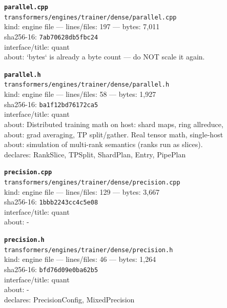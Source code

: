 \noindent\textbf{\texttt{parallel.cpp}}\\
\texttt{transformers/engines/trainer/dense/parallel.cpp}\\
kind: engine file --- lines/files: 197 --- bytes: 7,011\\
sha256-16: \texttt{7ab70628db5fbc24}\\
interface/title: quant\\
about: `bytes` is already a byte count — do NOT scale it again.\\
\vspace*{6.0pt}

\noindent\textbf{\texttt{parallel.h}}\\
\texttt{transformers/engines/trainer/dense/parallel.h}\\
kind: engine file --- lines/files: 58 --- bytes: 1,927\\
sha256-16: \texttt{ba1f12bd76172ca5}\\
interface/title: quant\\
about: Distributed training math on host: shard maps, ring allreduce,\\
about: grad averaging, TP split/gather. Real tensor math, single-host\\
about: simulation of multi-rank semantics (ranks run as slices).\\
declares: RankSlice, TPSplit, ShardPlan, Entry, PipePlan\\
\vspace*{6.0pt}

\noindent\textbf{\texttt{precision.cpp}}\\
\texttt{transformers/engines/trainer/dense/precision.cpp}\\
kind: engine file --- lines/files: 129 --- bytes: 3,667\\
sha256-16: \texttt{1bbb2243cc4c5e08}\\
interface/title: quant\\
about: -\\
\vspace*{6.0pt}

\noindent\textbf{\texttt{precision.h}}\\
\texttt{transformers/engines/trainer/dense/precision.h}\\
kind: engine file --- lines/files: 46 --- bytes: 1,264\\
sha256-16: \texttt{bfd76d09e0ba62b5}\\
interface/title: quant\\
about: -\\
declares: PrecisionConfig, MixedPrecision\\
\vspace*{6.0pt}
\newpage

